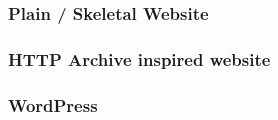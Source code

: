 


\subsubsection{Plain / Skeletal Website}


    



\subsubsection{HTTP Archive inspired website}













\subsubsection{WordPress}


